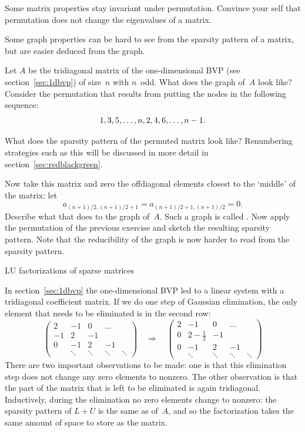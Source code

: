 \begin{remark}
  Some matrix properties stay invariant under permutation. Convince
  your self that permutation does not change the eigenvalues of a matrix.
\end{remark}

Some graph properties can be hard to see from the sparsity pattern of
a matrix, but are easier deduced from the graph.

\begin{exercise}
  \label{ex:rb-tridiagonal}
  Let $A$ be the tridiagonal matrix of the one-dimensional \ac{BVP}
  (see section~\ref{sec:1dbvp}) of size~$n$ with $n$~odd. What does
  the graph of~$A$ look like?  Consider the permutation that results
  from putting the nodes in the following sequence:
  \[ 1,3,5,\ldots,n,2,4,\allowbreak6,\ldots,\allowbreak n-\nobreak1. \]

  What does the sparsity pattern of the permuted matrix look like?
  Renumbering strategies such as this will be discussed in more detail
  in section~\ref{sec:redblackgreen}.

  \label{ex:reducible-tridiagonal}
  Now take this matrix and zero the
  offdiagonal elements closest to the `middle' of the matrix: let
  \[ a_{(n+1)/2,(n+1)/2+1}=a_{(n+1)/2+1,(n+1)/2}=0. \]
  Describe what that
  does to the graph of~$A$. Such a graph is called
  . Now apply the permutation of the previous
  exercise and sketch the resulting sparsity pattern. Note that the
  reducibility of the graph is now harder to read from the sparsity
  pattern.
\end{exercise}

 {LU factorizations of sparse matrices}
\label{sec:fill}

In section~\ref{sec:1dbvp} the one-dimensional \ac{BVP} led to a
linear system with a tridiagonal coefficient matrix. If we do one
step of Gaussian elimination, the only element that needs to be
eliminated is in the second row:
\[
\begin{pmatrix}
  2&-1&0&\ldots\\ -1&2&-1\\ 0&-1&2&-1\\ 
  &\ddots&\ddots&\ddots&\ddots
\end{pmatrix}
\quad\Rightarrow\quad
\left(\begin{array}{c|cccc}
  2&-1&0&\ldots\\ \hline 0&2-\frac12&-1\\ 0&-1&2&-1\\ 
  &\ddots&\ddots&\ddots&\ddots
\end{array}\right)
\]
There are two important observations to be
made: one is that this elimination step does not change any zero
elements to nonzero. The other observation is that the part of the
matrix that is left to be eliminated is again
tridiagonal. Inductively, during the elimination no zero elements
change to nonzero: the sparsity pattern of $L+U$ is the same as
of~$A$, and so the factorization takes the same amount of space to
store as the matrix.

